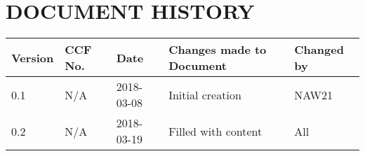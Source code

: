 \documentclass{project}
\begin{document}
	\section*{DOCUMENT HISTORY}
	\begin{tabular}{| l | l | l | l | l |}
		\hline
		Version & CCF No. & Date & Changes made to Document & Changed by \\
		\hline
		0.1 & N/A & 2018-03-08 & Initial creation & NAW21 \\ \hline
        0.2 & N/A & 2018-03-19 & Filled with content & All \\
		\hline
	\end{tabular}
	\label{thelastpage}
\end{document}
